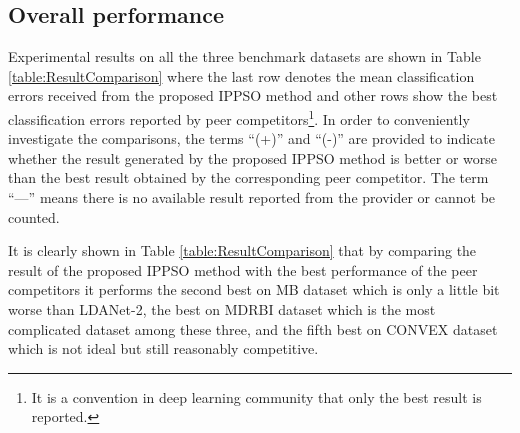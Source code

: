 \documentclass[conference]{IEEEtran}
\begin{document}
\subsection{Overall performance}\label{sec:Performance}

Experimental results on all the three benchmark datasets are shown in Table \ref{table:ResultComparison} where the last row denotes the mean classification errors received from the proposed IPPSO method and other rows show the best classification errors reported by peer competitors\footnote{It is a convention in deep learning community that only the best result is reported.}. In order to conveniently investigate the comparisons, the terms “(+)” and “(-)” are provided to indicate whether the result generated by the proposed IPPSO method is better or worse than the best result obtained by the corresponding peer competitor. The term “—” means there is no available result reported from the provider or cannot be counted.

It is clearly shown in Table \ref{table:ResultComparison} that by comparing the result of the proposed IPPSO method with the best performance of the peer competitors it performs the second best on MB dataset which is only a little bit worse than LDANet-2, the best on MDRBI dataset which is the most complicated dataset among these three, and the fifth best on CONVEX dataset which is not ideal but still reasonably competitive. 
\end{document}
